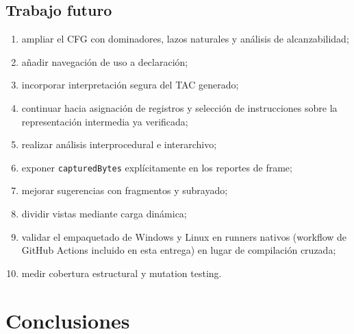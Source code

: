 \documentclass[11pt,letterpaper,oneside]{report}
\newcommand{\codigo}[1]{\texttt{#1}}
\begin{document}
\section{Trabajo futuro}

\begin{enumerate}
  \item ampliar el CFG con dominadores, lazos naturales y análisis de alcanzabilidad;
  \item añadir navegación de uso a declaración;
  \item incorporar interpretación segura del TAC generado;
  \item continuar hacia asignación de registros y selección de instrucciones sobre
        la representación intermedia ya verificada;
  \item realizar análisis interprocedural e interarchivo;
  \item exponer \codigo{capturedBytes} explícitamente en los reportes de frame;
  \item mejorar sugerencias con fragmentos y subrayado;
  \item dividir vistas mediante carga dinámica;
  \item validar el empaquetado de Windows y Linux en runners nativos (workflow de
        GitHub Actions incluido en esta entrega) en lugar de compilación cruzada;
  \item medir cobertura estructural y mutation testing.
\end{enumerate}

\chapter{Conclusiones}
\end{document}
